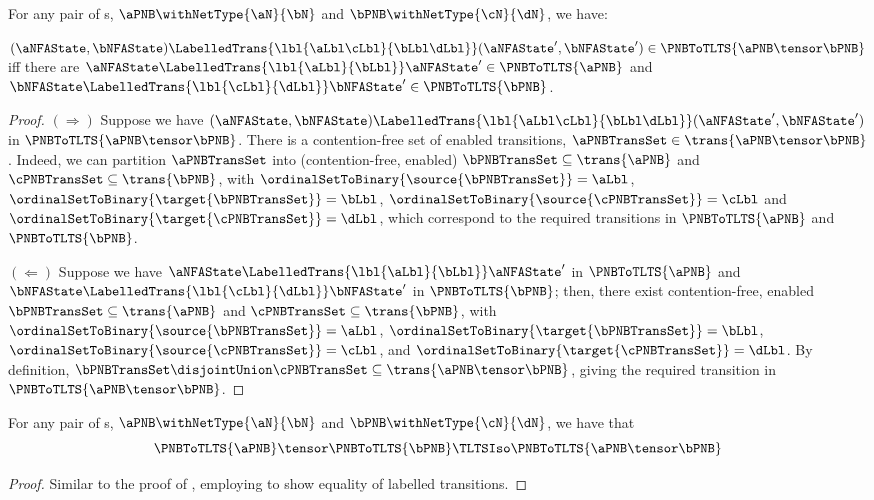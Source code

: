 \begin{lemma} \label{lem:functorTensorArrows}
    For any pair of \PNB{}s, $\aPNB \withNetType{\aN}{\bN}$ and $\bPNB
    \withNetType{\cN}{\dN}$, we have:

    $(\aNFAState, \bNFAState) \LabelledTrans{\lbl{\aLbl\cLbl}{\bLbl\dLbl}}
    (\aNFAState', \bNFAState') \in \PNBToTLTS{\aPNB \tensor \bPNB}$ iff there
    are $\aNFAState \LabelledTrans{\lbl{\aLbl}{\bLbl}} \aNFAState' \in
    \PNBToTLTS{\aPNB}$ and $\bNFAState \LabelledTrans{\lbl{\cLbl}{\dLbl}}
    \bNFAState' \in \PNBToTLTS{\bPNB}$.
\end{lemma}
\begin{proof}
    $(\Rightarrow)$ Suppose we have $(\aNFAState, \bNFAState)
    \LabelledTrans{\lbl{\aLbl\cLbl}{\bLbl\dLbl}} (\aNFAState', \bNFAState')$
    in $\PNBToTLTS{\aPNB \tensor \bPNB}$. There is a contention-free
    set of enabled transitions, $\aPNBTransSet \in \trans{\aPNB \tensor
    \bPNB}$. Indeed, we can partition $\aPNBTransSet$ into (contention-free,
    enabled) $\bPNBTransSet \subseteq \trans{\aPNB}$ and $\cPNBTransSet
    \subseteq \trans{\bPNB}$, with $\ordinalSetToBinary{\source{\bPNBTransSet}}
    = \aLbl$, $\ordinalSetToBinary{\target{\bPNBTransSet}} = \bLbl$,
    $\ordinalSetToBinary{\source{\cPNBTransSet}} = \cLbl$ and
    $\ordinalSetToBinary{\target{\cPNBTransSet}} = \dLbl$, which correspond to
    the required transitions in $\PNBToTLTS{\aPNB}$ and $\PNBToTLTS{\bPNB}$.

    $(\Leftarrow)$ Suppose we have $\aNFAState
    \LabelledTrans{\lbl{\aLbl}{\bLbl}} \aNFAState'$ in $\PNBToTLTS{\aPNB}$
    and $\bNFAState \LabelledTrans{\lbl{\cLbl}{\dLbl}} \bNFAState'$ in
    $\PNBToTLTS{\bPNB}$; then, there exist contention-free, enabled
    $\bPNBTransSet \subseteq \trans{\aPNB}$ and $\cPNBTransSet \subseteq
    \trans{\bPNB}$, with $\ordinalSetToBinary{\source{\bPNBTransSet}} =
    \aLbl$, $\ordinalSetToBinary{\target{\bPNBTransSet}} = \bLbl$,
    $\ordinalSetToBinary{\source{\cPNBTransSet}} = \cLbl$, and
    $\ordinalSetToBinary{\target{\cPNBTransSet}} = \dLbl$. By definition,
    $\bPNBTransSet \disjointUnion \cPNBTransSet \subseteq \trans{\aPNB \tensor
    \bPNB}$, giving the required transition in $\PNBToTLTS{\aPNB \tensor
    \bPNB}$.
\end{proof}

\begin{proposition} \label{prop:functorTensors}
    For any pair of \PNB{}s, $\aPNB \withNetType{\aN}{\bN}$ and $\bPNB
    \withNetType{\cN}{\dN}$, we have that
    \[
    \PNBToTLTS{\aPNB} \tensor \PNBToTLTS{\bPNB}
    \TLTSIso
    \PNBToTLTS{\aPNB \tensor \bPNB}
    \]
\end{proposition}
\begin{proof}
    Similar to the proof of , employing
     to show equality of labelled transitions.
\end{proof}


